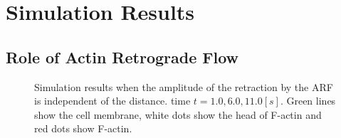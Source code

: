 \documentclass[a4paper,12pt, oneside]{book}
\begin{document}
\section{Simulation Results}
\subsection{Role of Actin Retrograde Flow}
\begin{figure}[tbp]
 \caption{Simulation results when the amplitude of the retraction by the ARF is independent of the distance. time $t = 1.0, 6.0,11.0 [s]$. Green lines show the cell membrane, white dots show the head of F-actin and red dots show F-actin.}
 \label{fig:res0}
\end{figure}
\end{document}
